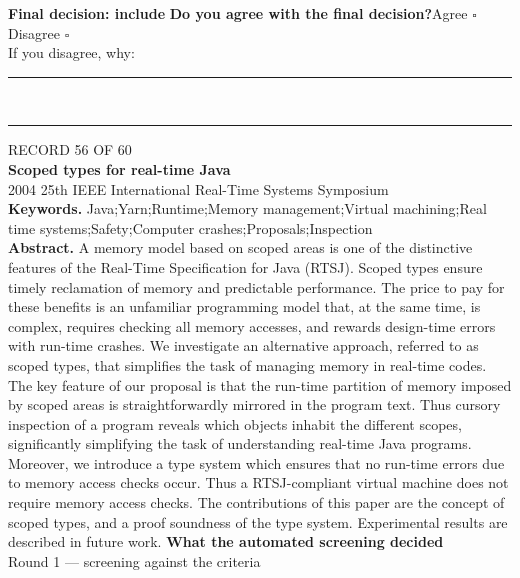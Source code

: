 \documentclass[11pt,a4paper]{article}
\begin{document}
{\small\textbf{Final decision: include}}
\vspace{2mm}
{\small\textbf{Do you agree with the final decision?}\quad{}Agree $\square$\qquad{}Disagree $\square$}\\[1mm]
{\footnotesize\color{soft}If you disagree, why:}\\[1mm]
\color{rule}\rule{\linewidth}{0.3pt}\\[3mm]\rule{\linewidth}{0.3pt}\color{black}
\clearpage
{\color{soft}\footnotesize RECORD 56 OF 60}\\[1mm]
{\large\bfseries Scoped types for real-time Java}\\[1.5mm]
{\color{soft}\small 2004 \textperiodcentered{} 25th IEEE International Real-Time Systems Symposium}\\[2mm]
{\small\textbf{Keywords.} Java;Yarn;Runtime;Memory management;Virtual machining;Real time systems;Safety;Computer crashes;Proposals;Inspection}\\[2mm]
{\small\textbf{Abstract.} A memory model based on scoped areas is one of the distinctive features of the Real-Time Specification for Java (RTSJ). Scoped types ensure timely reclamation of memory and predictable performance. The price to pay for these benefits is an unfamiliar programming model that, at the same time, is complex, requires checking all memory accesses, and rewards design-time errors with run-time crashes. We investigate an alternative approach, referred to as scoped types, that simplifies the task of managing memory in real-time codes. The key feature of our proposal is that the run-time partition of memory imposed by scoped areas is straightforwardly mirrored in the program text. Thus cursory inspection of a program reveals which objects inhabit the different scopes, significantly simplifying the task of understanding real-time Java programs. Moreover, we introduce a type system which ensures that no run-time errors due to memory access checks occur. Thus a RTSJ-compliant virtual machine does not require memory access checks. The contributions of this paper are the concept of scoped types, and a proof soundness of the type system. Experimental results are described in future work.}
\vspace{3mm}
\vspace{2.5mm}
{\small\textbf{What the automated screening decided}}\\[2mm]
{\footnotesize\color{soft}Round 1 --- screening against the criteria}\\[0.5mm]
\end{document}
